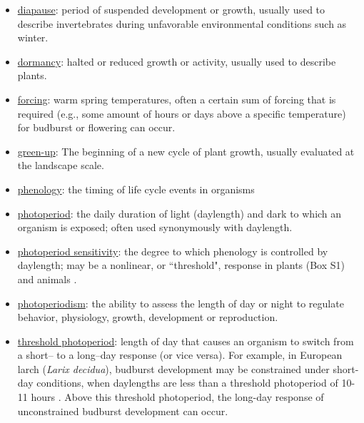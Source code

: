 \documentclass{article}
\begin{document}
\begin{itemize}
\item \underline{diapause}: period of suspended development or growth, usually used to describe invertebrates during unfavorable environmental conditions such as winter.
\item \underline{dormancy}: halted or reduced growth or activity, usually used to describe plants.
\item \underline{forcing}: warm spring temperatures, often a certain sum of forcing that is  required (e.g., some amount of hours or days above a specific temperature) for budburst or flowering can occur.
\item \underline{green-up}: The beginning of a new cycle of plant growth, usually evaluated at the landscape scale.
\item \underline{phenology}: the timing of life cycle events in organisms
\item \underline{photoperiod}: the daily duration of light (daylength) and dark to which an organism is exposed; often used synonymously with daylength.
\item \underline{photoperiod sensitivity}: the degree to which phenology is controlled by daylength; may be a nonlinear, or ``threshold", response in plants (Box S1) and animals \citep{tobin2008,grevstad2015}.
\item \underline{photoperiodism}: the ability to assess the length of day or night to regulate behavior, physiology, growth, development or reproduction.
\item \underline{threshold photoperiod}: length of day that causes an organism to switch from a short-- to a long--day response (or vice versa). For example, in European larch (\emph{Larix decidua}), budburst development may be constrained under short-day conditions, when daylengths are less than a threshold photoperiod of 10-11 hours \citep{migliavacca2008}. Above this threshold photoperiod, the long-day response of unconstrained budburst development can occur.
\end{itemize}
\end{document}
